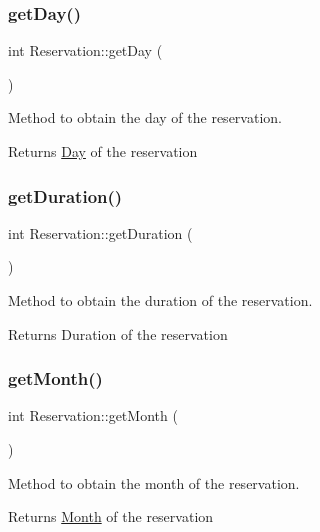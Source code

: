 \subsubsection{\texorpdfstring{get\+Day()}{getDay()}}
{\footnotesize\ttfamily int Reservation\+::get\+Day (\begin{DoxyParamCaption}{ }\end{DoxyParamCaption})}



Method to obtain the day of the reservation. 

\begin{DoxyReturn}{Returns}
\mbox{\hyperlink{class_day}{Day}} of the reservation 
\end{DoxyReturn}
\mbox{\label{class_reservation_a9d91ef1230af46952cb5422ae769bfa1}} 
\subsubsection{\texorpdfstring{get\+Duration()}{getDuration()}}
{\footnotesize\ttfamily int Reservation\+::get\+Duration (\begin{DoxyParamCaption}{ }\end{DoxyParamCaption})}



Method to obtain the duration of the reservation. 

\begin{DoxyReturn}{Returns}
Duration of the reservation 
\end{DoxyReturn}
\mbox{\label{class_reservation_adbc454654e7e861d80c8740f85e0fb10}} 
\subsubsection{\texorpdfstring{get\+Month()}{getMonth()}}
{\footnotesize\ttfamily int Reservation\+::get\+Month (\begin{DoxyParamCaption}{ }\end{DoxyParamCaption})}



Method to obtain the month of the reservation. 

\begin{DoxyReturn}{Returns}
\mbox{\hyperlink{class_month}{Month}} of the reservation 
\end{DoxyReturn}
\mbox{\label{class_reservation_a62cdb2f1a24e2fce92fb9f024ae9f494}} 
